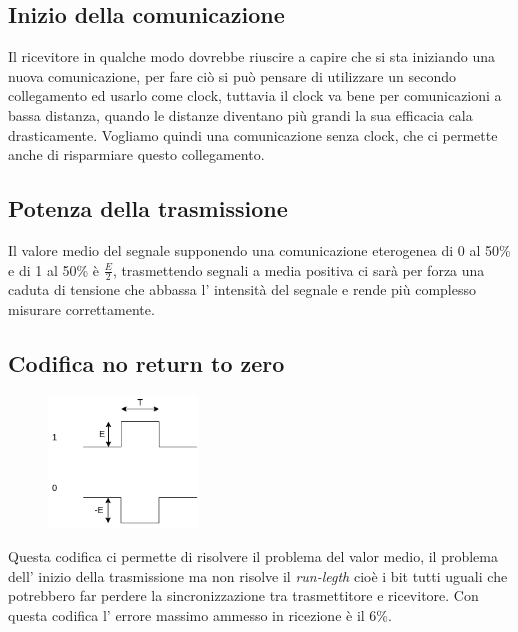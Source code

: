 \subsection{Inizio della comunicazione}
Il ricevitore in qualche modo dovrebbe riuscire a capire che si sta iniziando una nuova comunicazione, per fare ciò si può pensare di utilizzare un secondo collegamento ed usarlo come clock, tuttavia il clock va bene per comunicazioni a bassa distanza, quando le distanze diventano più grandi la sua efficacia cala drasticamente.
Vogliamo quindi una comunicazione senza clock, che ci permette anche di risparmiare questo collegamento.

\subsection{Potenza della trasmissione}
Il valore medio del segnale supponendo una comunicazione eterogenea di 0 al 50\% e di 1 al 50\% è $\frac{E}{2}$, trasmettendo segnali a media positiva ci sarà per forza una caduta di tensione che abbassa l' intensità del segnale e rende più complesso misurare correttamente.

\subsection{Codifica no return to zero}
\begin{figure}[H]
    \centering
    \includegraphics[width=150px]{images/22_USART/no_return_to_zero_encode.png}
\end{figure}
Questa codifica ci permette di risolvere il problema del valor medio, il problema dell' inizio della trasmissione ma non risolve il \emph{run-legth} cioè i bit tutti uguali che potrebbero far perdere la sincronizzazione tra trasmettitore e ricevitore.
Con questa codifica l' errore massimo ammesso in ricezione è il 6\%.

